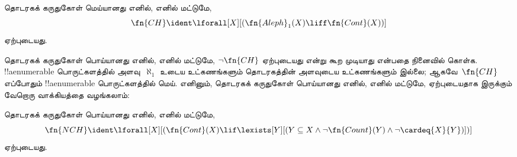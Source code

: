 \documentclass[../../../include/open-logic-section]{subfiles}
\begin{document}
\begin{prop}
தொடரகக் கருதுகோள் மெய்யானது எனில், எனில் மட்டுமே,
\[\fn{CH} \ident
\lforall[X][(\fn{Aleph}_1(X) \liff \fn{Cont}(X))]\]
ஏற்புடையது.
\end{prop}

தொடரகக் கருதுகோள் பொய்யானது எனில், எனில் மட்டுமே,
$\lnot \fn{CH}$ ஏற்புடையது என்று கூற முடியாது என்பதை நினைவில் கொள்க.
!!a{enumerable} பொருட்களத்தில் அளவு~$\aleph_1$ உடைய உட்கணங்களும்
தொடரகத்தின் அளவுடைய உட்கணங்களும் இல்லை; ஆகவே~$\fn{CH}$ எப்போதும்
!!a{enumerable} பொருட்களத்தில் மெய். எனினும், தொடரகக் கருதுகோள்
பொய்யானது எனில், எனில் மட்டுமே, ஏற்புடையதாக இருக்கும் வேறொரு
வாக்கியத்தை வழங்கலாம்:

\begin{prop}
தொடரகக் கருதுகோள் பொய்யானது எனில், எனில் மட்டுமே,
\[\fn{NCH} \ident
\lforall[X][(\fn{Cont}(X) \lif \lexists[Y][(Y \subseteq X \land \lnot
    \fn{Count}(Y) \land \lnot \cardeq{X}{Y})])]\]
ஏற்புடையது.
\end{prop}
\end{document}
